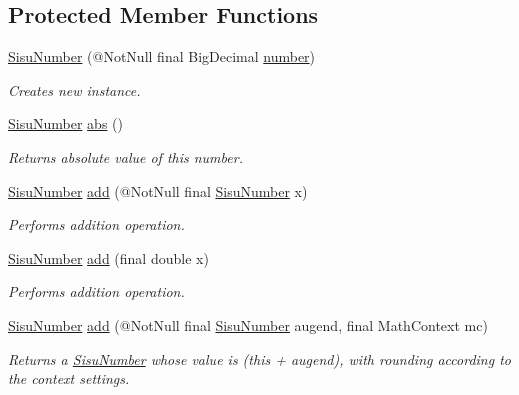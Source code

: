 \subsection*{Protected Member Functions}
\begin{DoxyCompactItemize}
\item 
\hyperlink{classcom_1_1aarrelaakso_1_1drawl_1_1_sisu_number_a65081a1817d003c1f9b9dfa8d96af2f1}{Sisu\+Number} (@Not\+Null final Big\+Decimal \hyperlink{classcom_1_1aarrelaakso_1_1drawl_1_1_sisu_number_a5741c4131458787e3adb0bfe649d7758}{number})
\begin{DoxyCompactList}\small\item\em Creates new instance. \end{DoxyCompactList}\item 
\hyperlink{classcom_1_1aarrelaakso_1_1drawl_1_1_sisu_number}{Sisu\+Number} \hyperlink{classcom_1_1aarrelaakso_1_1drawl_1_1_sisu_number_ab0fbcc012471bbf5dc73166c9e27c66c}{abs} ()
\begin{DoxyCompactList}\small\item\em Returns absolute value of this number. \end{DoxyCompactList}\item 
\hyperlink{classcom_1_1aarrelaakso_1_1drawl_1_1_sisu_number}{Sisu\+Number} \hyperlink{classcom_1_1aarrelaakso_1_1drawl_1_1_sisu_number_aae549e52d35575127f6bd52a31d2b2a1}{add} (@Not\+Null final \hyperlink{classcom_1_1aarrelaakso_1_1drawl_1_1_sisu_number}{Sisu\+Number} x)
\begin{DoxyCompactList}\small\item\em Performs addition operation. \end{DoxyCompactList}\item 
\hyperlink{classcom_1_1aarrelaakso_1_1drawl_1_1_sisu_number}{Sisu\+Number} \hyperlink{classcom_1_1aarrelaakso_1_1drawl_1_1_sisu_number_ab3743d41ecc3be5c0e8ca01f958fd166}{add} (final double x)
\begin{DoxyCompactList}\small\item\em Performs addition operation. \end{DoxyCompactList}\item 
\hyperlink{classcom_1_1aarrelaakso_1_1drawl_1_1_sisu_number}{Sisu\+Number} \hyperlink{classcom_1_1aarrelaakso_1_1drawl_1_1_sisu_number_abb2250aca90eb9a85d81c8d83c811a54}{add} (@Not\+Null final \hyperlink{classcom_1_1aarrelaakso_1_1drawl_1_1_sisu_number}{Sisu\+Number} augend, final Math\+Context mc)
\begin{DoxyCompactList}\small\item\em Returns a \hyperlink{classcom_1_1aarrelaakso_1_1drawl_1_1_sisu_number}{Sisu\+Number} whose value is (this + augend), with rounding according to the context settings. \end{DoxyCompactList}\item 

\end{DoxyCompactItemize}
